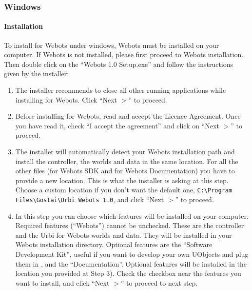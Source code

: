 \subsubsection{Windows}
\label{webots.setup.windows}%

\paragraph{Installation}
\label{webots.setup.windows.installation}%

To install \urbi for Webots under windows, Webots must be installed on
your computer. If Webots is not installed, please first proceed to
Webots installation. Then double click on the ``\urbi Webots 1.0
Setup.exe'' and follow the instructions given by the installer:

\begin{enumerate}
\item The installer recommends to close all other running applications
  while installing \urbi for Webots. Click ``Next $>$'' to proceed.

\item Before installing \urbi for Webots, read and accept the Licence
  Agreement. Once you have read it, check ``I accept the agreement'' and
  click on ``Next $>$'' to proceed.

\item The installer will automatically detect your Webots installation
  path and install the \urbi controller, the worlds and data in the
  same location. For all the other files (\urbi for Webots SDK and
  \urbi for Webots Documentation) you have to provide a new
  location. This is what the installer is asking at this step. Choose
  a custom location if you don't want the default one,
  \verb+C:\Program Files\Gostai\Urbi Webots 1.0+, and click
  ``Next $>$'' to proceed.

\item In this step you can choose which features will be installed on
  your computer. Required features (``\urbi Webots'') cannot be
  unchecked. These are the \urbi controller and the Urbi for Webots
  worlds and data. They will be installed in your Webots installation
  directory. Optional features are the ``\urbi Software Development
  Kit'', useful if you want to develop your own UObjects and plug them
  in \urbi, and the ``\urbi Documentation''. Optional features will be
  installed in the location you provided at Step 3).  Check the
  checkbox near the features you want to install, and click ``Next $>$''
  to proceed to next step.


\end{enumerate}

